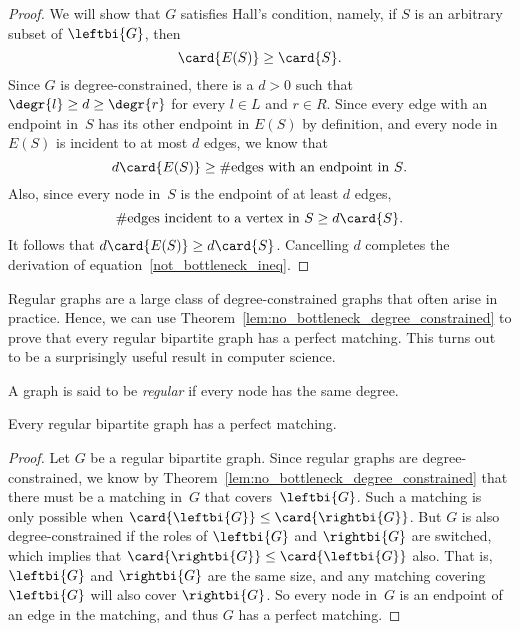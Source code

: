 \begin{proof}

\iffalse
  The proof is by contradiction.  Suppose that $G$ is degree-constrained
  but that there is no matching that covers~$\leftbi{G}$.  By
  Theorem~\ref{thm:halls}, this means that there must be a bottleneck $S
  \subseteq \leftbi{G}$.
\fi

  We will show that $G$ satisfies Hall's condition, namely, if $S$ is
  an arbitrary subset of $\leftbi{G}$, then
\begin{equation}\label{not_bottleneck_ineq}
\card{E(S)} \ge \card{S}.  
\end{equation}
  Since $G$ is degree-constrained, there is a $d>0$ such that
  $\degr{l} \ge d \ge \degr{r}$ for every $l \in L$ and $r \in R$.
  Since every edge with an endpoint in~$S$ has its other endpoint in
  $E(S)$ by definition, and every node in $E(S)$ is incident to at
  most $d$ edges, we know that
\[
d\card{E(S)} \geq \#\text{edges with an endpoint in $S$}.
\]
Also, since every node in~$S$ is the endpoint of at least $d$ edges,
\[
\#\text{edges incident to a vertex in $S$} \geq d\card{S}.
\]
It follows that $d\card{E(S)} \ge d\card{S}$.  Cancelling $d$
completes the derivation of equation~\eqref{not_bottleneck_ineq}.
\end{proof}

Regular graphs are a large class of degree-constrained graphs that
often arise in practice.  Hence, we can use
Theorem~\ref{lem:no_bottleneck_degree_constrained} to prove that every
regular bipartite graph has a perfect matching.  This turns out to be
a surprisingly useful result in computer science.

\begin{definition}\label{def:5P}
A graph is said to be \emph{regular} if every node has the same degree.
\end{definition}

\begin{theorem}\label{thm:5M}
Every regular bipartite graph has a perfect matching.
\end{theorem}

\begin{proof}
  Let $G$ be a regular bipartite graph.  Since regular graphs are
  degree-constrained, we know by
  Theorem~\ref{lem:no_bottleneck_degree_constrained} that there must
  be a matching in~$G$ that covers~$\leftbi{G}$.  Such a matching is
  only possible when $\card{\leftbi{G}} \leq \card{\rightbi{G}}$.  But
  $G$ is also degree-constrained if the roles of $\leftbi{G}$ and
  $\rightbi{G}$ are switched, which implies that $\card{\rightbi{G}}
  \leq \card{\leftbi{G}}$ also.  That is, $\leftbi{G}$ and
  $\rightbi{G}$ are the same size, and any matching covering
  $\leftbi{G}$ will also cover $\rightbi{G}$.  So every node in~$G$ is
  an endpoint of an edge in the matching, and thus $G$ has a perfect
  matching.
\end{proof}

